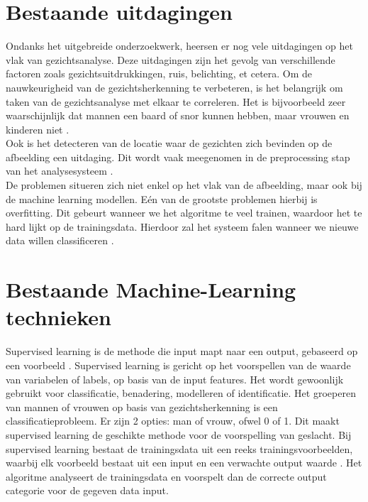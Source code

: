 \section{Bestaande uitdagingen} \label{sec:uitdagingen}
Ondanks het uitgebreide onderzoekwerk, heersen er nog vele uitdagingen op het vlak van gezichtsanalyse. Deze uitdagingen zijn het gevolg van verschillende factoren zoals gezichtsuitdrukkingen, ruis, belichting, et cetera. Om de nauwkeurigheid van de gezichtsherkenning te verbeteren, is het belangrijk om taken van de gezichtsanalyse met elkaar te correleren. Het is bijvoorbeeld zeer waarschijnlijk dat mannen een baard of snor kunnen hebben, maar vrouwen en kinderen niet \autocite{Siddiqi2022}. 
\\
Ook is het detecteren van de locatie waar de gezichten zich bevinden op de afbeelding een uitdaging. Dit wordt vaak meegenomen in de preprocessing stap van het analysesysteem \autocite{Jiang2008}.
\\
De problemen situeren zich niet enkel op het vlak van de afbeelding, maar ook bij de machine learning modellen. Eén van de grootste problemen hierbij is overfitting. Dit gebeurt wanneer we het algoritme te veel trainen, waardoor het te hard lijkt op de trainingsdata. Hierdoor zal het systeem falen wanneer we nieuwe data willen classificeren \autocite{Coppens2018}.

\section{Bestaande Machine-Learning technieken} \label{sec:bestaandeml}
Supervised learning is de methode die input mapt naar een output, gebaseerd op een voorbeeld \autocite{Rustam2018}. Supervised learning is gericht op het voorspellen van de waarde van variabelen of labels, op basis van de input features. Het wordt gewoonlijk gebruikt voor classificatie, benadering, modelleren of identificatie. Het groeperen van mannen of vrouwen op basis van gezichtsherkenning is een classificatieprobleem. Er zijn 2 opties: man of vrouw, ofwel 0 of 1. Dit maakt supervised learning de geschikte methode voor de voorspelling van geslacht. Bij supervised learning bestaat de trainingsdata uit een reeks trainingsvoorbeelden, waarbij elk voorbeeld bestaat uit een input en een verwachte output waarde \autocite{Shah2012}. Het algoritme analyseert de trainingsdata en voorspelt dan de correcte output categorie voor de gegeven data input.  

